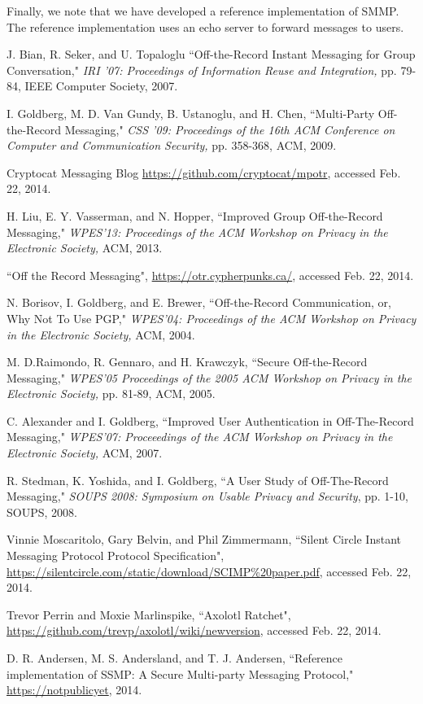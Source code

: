\documentclass[%
preprint,
amsmath,amssymb,
aps,
prb,
floatfix,
]{revtex4-1}
\begin{document}
Finally, we note that we have developed a reference
implementation\cite{ref:referenceimplementation} of SMMP. The reference
implementation uses an echo server to forward messages to users.
\begin{thebibliography}{99}
 J. Bian, R. Seker, and U. Topaloglu ``Off-the-Record Instant
Messaging for Group Conversation," \textit{IRI '07: Proceedings of Information
Reuse and Integration,} pp. 79-84, IEEE Computer Society, 2007.

 I. Goldberg, M. D. Van Gundy, B. Ustanoglu, and H. Chen,
``Multi-Party Off-the-Record Messaging," \textit{CSS '09: Proceedings of the
16th ACM Conference on Computer and Communication Security,} pp. 358-368, ACM,
2009.

 Cryptocat Messaging Blog
\url{https://github.com/cryptocat/mpotr}, accessed Feb. 22, 2014.

 H. Liu, E. Y. Vasserman, and N. Hopper, ``Improved Group
Off-the-Record Messaging," \textit{WPES'13: Proceedings of the ACM Workshop on
Privacy in the Electronic Society,} ACM, 2013.

 ``Off the Record Messaging",
\url{https://otr.cypherpunks.ca/}, accessed Feb. 22, 2014.

 N. Borisov, I. Goldberg, and E. Brewer, ``Off-the-Record
Communication, or, Why Not To Use PGP," \textit{WPES'04: Proceedings of the
ACM Workshop on Privacy in the Electronic Society,} ACM, 2004.

 M. D.Raimondo, R. Gennaro, and H. Krawczyk, ``Secure
Off-the-Record Messaging," \textit{WPES'05 Proceedings of the 2005 ACM Workshop
on Privacy in the Electronic Society,} pp. 81-89, ACM, 2005.

 C. Alexander and I. Goldberg, ``Improved User Authentication
in Off-The-Record Messaging," \textit{WPES'07: Proceeedings of the ACM Workshop
on Privacy in the Electronic Society,} ACM, 2007.

 R. Stedman, K. Yoshida, and I. Goldberg, ``A User Study of
Off-The-Record Messaging," \textit{SOUPS 2008: Symposium on Usable Privacy and
Security}, pp. 1-10, SOUPS, 2008.

  Vinnie Moscaritolo, Gary Belvin, and Phil Zimmermann,
``Silent Circle Instant Messaging Protocol Protocol Specification",
\url{https://silentcircle.com/static/download/SCIMP%20paper.pdf}, accessed Feb.
22, 2014.

 Trevor Perrin and Moxie Marlinspike, ``Axolotl Ratchet",
\url{https://github.com/trevp/axolotl/wiki/newversion}, accessed Feb. 22, 2014.

 D. R. Andersen, M. S. Andersland, and T.
J. Andersen, ``Reference implementation of SSMP: A Secure Multi-party Messaging
Protocol," \url{https://notpublicyet}, 2014.

\end{thebibliography}
\end{document}
